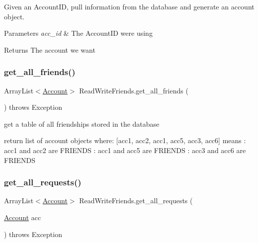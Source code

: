 Given an Account\+ID, pull information from the database and generate an account object. 


\begin{DoxyParams}{Parameters}
{\em acc\+\_\+id} & The Account\+ID we\textquotesingle{}re using \\
\hline
\end{DoxyParams}
\begin{DoxyReturn}{Returns}
The account we want 
\end{DoxyReturn}
\mbox{\label{class_read_write_friends_a1ca7ef459d275d7de8274ce119e4895d}} 
\subsubsection{\texorpdfstring{get\+\_\+all\+\_\+friends()}{get\_all\_friends()}}
{\footnotesize\ttfamily Array\+List$<$\hyperlink{class_account}{Account}$>$ Read\+Write\+Friends.\+get\+\_\+all\+\_\+friends (\begin{DoxyParamCaption}{ }\end{DoxyParamCaption}) throws Exception}


\begin{DoxyItemize}
\item get a table of all friendships stored in the database
\item return list of account objects where\+: \mbox{[}acc1, acc2, acc1, acc5, acc3, acc6\mbox{]} means \+: acc1 and acc2 are F\+R\+I\+E\+N\+DS \+: acc1 and acc5 are F\+R\+I\+E\+N\+DS \+: acc3 and acc6 are F\+R\+I\+E\+N\+DS 
\end{DoxyItemize}\mbox{\label{class_read_write_friends_ab55c8c1b2fc693bad5da1da3774dfab2}} 
\subsubsection{\texorpdfstring{get\+\_\+all\+\_\+requests()}{get\_all\_requests()}}
{\footnotesize\ttfamily Array\+List$<$\hyperlink{class_account}{Account}$>$ Read\+Write\+Friends.\+get\+\_\+all\+\_\+requests (\begin{DoxyParamCaption}\item[{\hyperlink{class_account}{Account}}]{acc }\end{DoxyParamCaption}) throws Exception}



